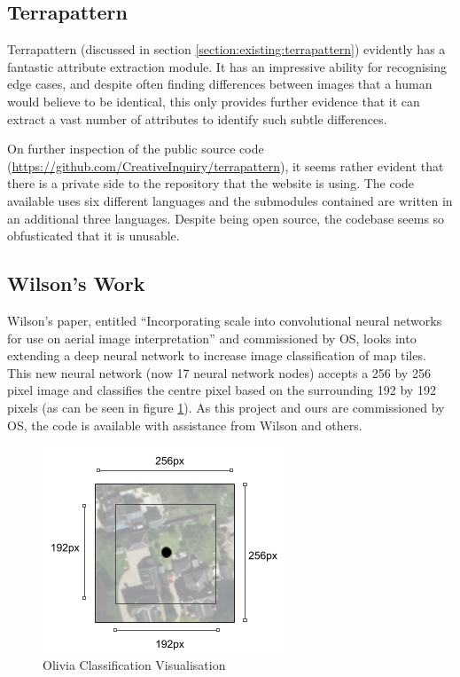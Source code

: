 \subsection{Terrapattern}

Terrapattern (discussed in section \ref{section:existing:terrapattern}) evidently has a fantastic attribute extraction module. It has an impressive ability for recognising edge cases, and despite often finding differences between images that a human would believe to be identical, this only provides further evidence that it can extract a vast number of attributes to identify such subtle differences. 

On further inspection of the public source code (\url{https://github.com/CreativeInquiry/terrapattern}), it seems rather evident that there is a private side to the repository that the website is using. The code available uses six different languages and the submodules contained are written in an additional three languages. Despite being open source, the codebase seems so obfusticated that it is unusable. 

\subsection{Wilson’s Work}

Wilson’s paper, entitled ``Incorporating scale into convolutional neural networks for use on aerial image interpretation” and commissioned by OS, looks into extending a deep neural network to increase image classification of map tiles. This new neural network (now 17 neural network nodes) accepts a 256 by 256 pixel image and classifies the centre pixel based on the surrounding 192 by 192 pixels (as can be seen in figure \ref{fig:olivia_range}). As this project and ours are commissioned by OS, the code is available with assistance from Wilson and others.

\begin{figure}[H]
    \centering
    \includegraphics{figs/7/tile_range}
    \caption{Olivia Classification Visualisation}
    \label{fig:olivia_range}
\end{figure}


